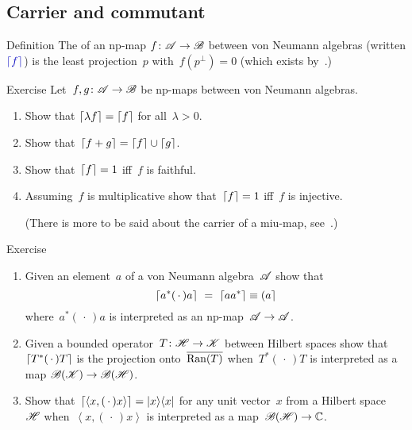 \documentclass[a]{subfiles}
\begin{document}
\subsection{Carrier and commutant}
\begin{parsec}%
\begin{point}[carrier]{Definition}%
The 
of an np-map $f\colon \mathscr{A}\to\mathscr{B}$
between von Neumann algebras
(written $\Define{\ceil{f}}$)
is the least projection~$p$
with~$f(p^\perp)=0$
(which exists by~.)
\end{point}
\begin{point}{Exercise}%
Let~$f,g\colon \mathscr{A}\to\mathscr{B}$
be np-maps between von Neumann algebras.
\begin{enumerate}
\item
Show that $\left\lceil\lambda f\right\rceil=\left\lceil f\right\rceil$
for all~$\lambda>0$.
\item
Show that~$\left\lceil f+g\right\rceil=\left\lceil f\right\rceil\cup\left\lceil g\right\rceil$.
\item
Show that~$\left\lceil f\right\rceil=1$ iff~$f$ is faithful.
\item
Assuming~$f$ is multiplicative
show that~$\left\lceil f\right\rceil=1$ iff~$f$ is injective.

(There is more to be said about
the carrier of a miu-map, see~.)
\end{enumerate}
\end{point}
\begin{point}{Exercise}%
\begin{enumerate}
\item
Given an element~$a$ of a von Neumann algebra~$\mathscr{A}$
show that 
\begin{equation*}
\ceil{a^*(\,\cdot\,)a}\ =\ \ceil{aa^*}\equiv \ceilr{a}
\end{equation*}
where~$a^*(\,\cdot\,)a$
is interpreted as an np-map~$\mathscr{A}\to\mathscr{A}$.
\item
Given a bounded operator~$T\colon \mathscr{H}\to\mathscr{K}$
between Hilbert spaces
show that~$\left\lceil T^*(\,\cdot\,)T\right\rceil$
is the projection onto~$\overline{\operatorname{Ran}(T)}$
when~$T^*(\,\cdot\,)T$
is interpreted 
as a map
$\mathscr{B}(\mathscr{K})\to\mathscr{B}(\mathscr{H})$.
\item
Show that~$\left\lceil\left<x,(\,\cdot\,)x\right>\right\rceil=\left|x\right>\!\left<x\right|$
for any unit vector~$x$ from a Hilbert space~$\mathscr{H}$
when~$\left<x,(\,\cdot\,)x\right>$
is interpreted as a map~$\mathscr{B}(\mathscr{H})\to\mathbb{C}$.


\end{enumerate}
\end{point}
\end{parsec}
\end{document}

